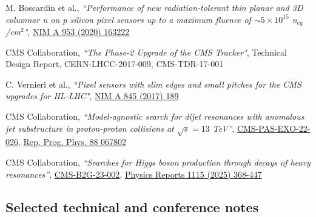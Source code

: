     
     \begin{refsection}
      \vspace{2mm}
      \onehalfspacing
 M. Boscardin et al., {\em ``Performance of new radiation-tolerant thin planar and 3D columnar n on p silicon pixel sensors up to a maximum fluence of $\sim 5 \times 10^{15}$   n$_{eq}$/cm$^2$"}, \href{https://doi.org/10.1016/j.nima.2019.163222}{NIM A 953 (2020) 163222}
     \end{refsection}
     
     
             \begin{refsection}
      \vspace{2mm}
      \onehalfspacing
  CMS Collaboration, {\sl ``The Phase-2 Upgrade of the CMS Tracker"}, Technical Design Report, CERN-LHCC-2017-009, CMS-TDR-17-001
 \end{refsection}
 
         \begin{refsection}
      \vspace{2mm}
      \onehalfspacing

 C. Vernieri et al., {\sl ``Pixel sensors with slim edges and small pitches for the CMS upgrades for HL-LHC"}, \href{http://dx.doi.org/10.1016/j.nima.2016.06.020}{NIM A 845 (2017) 189}

 \end{refsection}

\begin{refsection}
      \vspace{2mm}
      \onehalfspacing
CMS Collaboration, {\sl ``Model-agnostic search for dijet resonances with anomalous jet substructure in proton-proton collisions at $\sqrt{s}=13$ TeV''},
\href{https://cds.cern.ch/record/2892677?ln=en}{CMS-PAS-EXO-22-026},
\href{https://iopscience.iop.org/article/10.1088/1361-6633/add762}{Rep. Prog. Phys. 88 067802}
    \end{refsection}  
  
\begin{refsection}
      \vspace{2mm}
      \onehalfspacing
CMS Collaboration, {\sl ``Searches for Higgs boson production through decays of heavy resonances''},
\href{https://cds.cern.ch/record/2892661}{CMS-B2G-23-002},
\href{https://www.sciencedirect.com/journal/physics-reports/vol/1115/}{Physics Reports 1115 (2025) 368-447}
    \end{refsection}



\subsection{Selected technical and conference notes}

